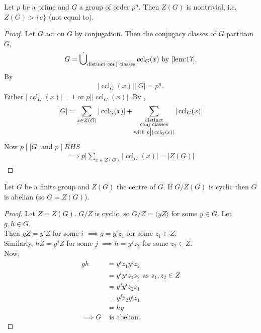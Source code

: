 \begin{proposition}\label{prp:7}
    Let $p$ be a prime and $G$ a group of order $p^n$.
    Then $Z(G)$ is nontrivial, i.e. $Z(G) > \{e\}$ (not equal to).
\end{proposition} 

\begin{proof}
    Let $G$ act on $G$ by conjugation.
    Then the conjugacy classes of $G$ partition $G$,
    \begin{align*}
        G = \mathbin{\dot{\bigcup}}_{\text{distinct conj classes}} \operatorname{ccl}_G(x) \text{ by \Cref{lem:17}}.
    \end{align*} 
    By  
    \begin{align*}
        |\operatorname{ccl}_G(x)| \bigg| |G| = p^n.
    \end{align*} 
    Either $|\operatorname{ccl}_G(x)| = 1$ or $p \bigg| |\operatorname{ccl}_G(x)|$.
    By , 
    \begin{align*}
        |G| = \sum_{x \in Z(G)} |\operatorname{ccl}_G(x)| + \sum_{\substack{\text{distinct} \\ \text{conj classes} \\ \text{with } p \bigm| |\operatorname{ccl}_G(x)|}} |\operatorname{ccl}_G(x)|
    \end{align*} 
    Now $p \mid |G|$ and $p \mid RHS$
    \begin{align*}
        \implies p \bigg| \sum_{x \in Z(G)} |\operatorname{ccl}_G(x)| = |Z(G)|
    \end{align*} 
\end{proof} 

\begin{lemma} \label{lem:19}
    Let $G$ be a finite group and $Z(G)$ the centre of $G$.
    If $G / Z(G)$ is cyclic then $G$ is abelian (so $G = Z(G)$).
\end{lemma} 

\begin{proof}
    Let $Z = Z(G)$.
    $G / Z$ is cyclic, so $G / Z = \langle y Z \rangle$ for some $y \in G$.
    Let $g, h \in G$. \\
    Then $gZ = y^i Z$ for some $i$ $\implies g = y^i z_1$ for some $z_1 \in Z$. \\
    Similarly, $hZ = y^j Z$ for some $j$ $\implies h = y^j z_2$ for some $z_2 \in Z$. \\
    Now, 
    \begin{align*}
        gh &= y^i z_1 y^j z_2 \\
        &= y^i y^j z_1 z_2 \text{ as $z_1, z_2 \in Z$} \\
        &= y^j y^i z_2 z_1 \\
        &= y^j z_2 y^i z_1 \\
        &= hg \\
        \implies G &\text{ is abelian}.
    \end{align*} 
\end{proof} 


